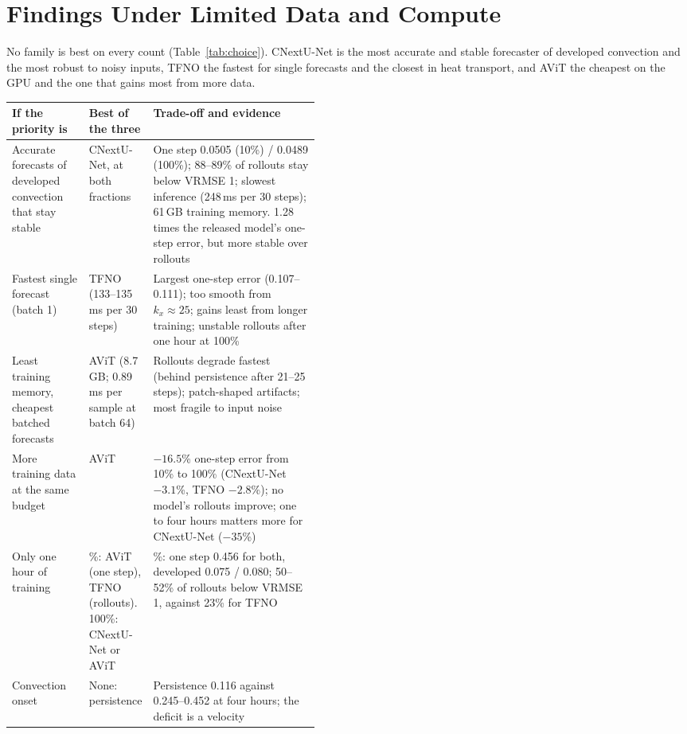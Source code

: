 \documentclass[11pt]{article}
\begin{document}
\section{Findings Under Limited Data and Compute}
\label{sec:findings}

No family is best on every count (Table~\ref{tab:choice}). CNextU-Net is the most accurate and stable forecaster of
developed convection and the most robust to noisy inputs, TFNO the fastest for single forecasts and the closest in heat
transport, and AViT the cheapest on the GPU and the one that gains most from more data.

\begin{table}[!htbp]
\centering\footnotesize
\begin{tabularx}{\linewidth}{@{}>{\raggedright\arraybackslash}p{0.25\linewidth}>{\raggedright\arraybackslash}p{0.2\linewidth}>{\raggedright\arraybackslash}X@{}}
\toprule
If the priority is & Best of the three & Trade-off and evidence \\
\midrule
Accurate forecasts of developed convection that stay stable & CNextU-Net, at both fractions & One step 0.0505
(10\%) / 0.0489 (100\%); 88--89\% of rollouts stay below VRMSE 1; slowest inference (248\,ms per 30 steps); 61\,GB
training memory. 1.28 times the released model's one-step error, but more stable over rollouts \\ \addlinespace[3pt]
Fastest single forecast (batch 1) & TFNO (133--135\,ms per 30 steps) & Largest one-step error (0.107--0.111); too
smooth from $k_x\approx25$; gains least from longer training; unstable rollouts after one hour at 100\% \\
\addlinespace[3pt]
Least training memory, cheapest batched forecasts & AViT (8.7\,GB; 0.89\,ms per sample at batch 64) & Rollouts
degrade fastest (behind persistence after 21--25 steps); patch-shaped artifacts; most fragile to input noise \\
\addlinespace[3pt]
More training data at the same budget & AViT & $-16.5$\% one-step error from 10\% to 100\% (CNextU-Net $-3.1$\%, TFNO
$-2.8$\%); no model's rollouts improve; one to four hours matters more for CNextU-Net ($-35$\%) \\ \addlinespace[3pt]
Only one hour of training & 10\%: AViT (one step), TFNO (rollouts). 100\%: CNextU-Net or AViT & 100\%: one step
0.456 for both, developed 0.075 / 0.080; 50--52\% of rollouts below VRMSE 1, against 23\% for TFNO \\
\addlinespace[3pt]
Convection onset & None: persistence & Persistence 0.116 against 0.245--0.452 at four hours; the deficit is a velocity

\end{tabularx}
\end{table}
\end{document}
